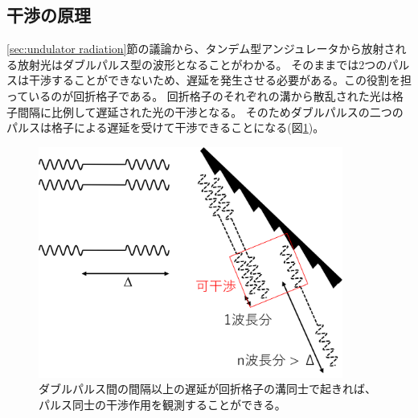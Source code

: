\documentclass[a4paper,11pt,uplatex]{jsbook}
\begin{document}
\subsection{干渉の原理}\label{sec:interference}
\ref{sec:undulator radiation}節の議論から、タンデム型アンジュレータから放射される放射光はダブルパルス型の波形となることがわかる。
そのままでは2つのパルスは干渉することができないため、遅延を発生させる必要がある。この役割を担っているのが回折格子である。
回折格子のそれぞれの溝から散乱された光は格子間隔に比例して遅延された光の干渉となる。
そのためダブルパルスの二つのパルスは格子による遅延を受けて干渉できることになる(図\ref{fig:doublepulse})。
\begin{figure}[H]
  \centering
  \includegraphics[width=10cm]{image/2-doublepulse.png}
  \caption[干渉の原理]{ダブルパルス間の間隔以上の遅延が回折格子の溝同士で起きれば、パルス同士の干渉作用を観測することができる。}
  \label{fig:doublepulse}
\end{figure}
\end{document}
